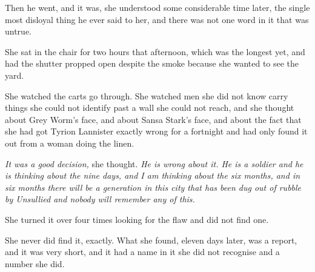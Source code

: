Then he went, and it was, she understood some considerable time later, the single most disloyal thing he ever said to her, and there was not one word in it that was untrue.

\sceneBreak

She sat in the chair for two hours that afternoon, which was the longest yet, and had the shutter propped open despite the smoke because she wanted to see the yard.

She watched the carts go through. She watched men she did not know carry things she could not identify past a wall she could not reach, and she thought about Grey Worm’s face, and about Sansa Stark’s face, and about the fact that she had got Tyrion Lannister exactly wrong for a fortnight and had only found it out from a woman doing the linen.

\textit{It was a good decision,} she thought. \textit{He is wrong about it. He is a soldier and he is thinking about the nine days, and I am thinking about the six months, and in six months there will be a generation in this city that has been dug out of rubble by Unsullied and nobody will remember any of this.}

She turned it over four times looking for the flaw and did not find one.

She never did find it, exactly. What she found, eleven days later, was a report, and it was very short, and it had a name in it she did not recognise and a number she did.
